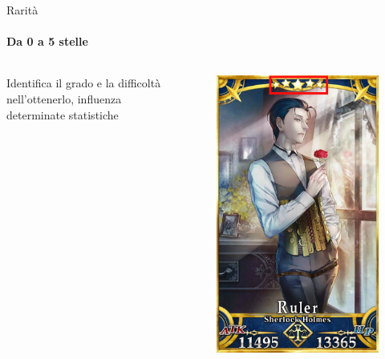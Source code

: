 \documentclass{beamer}
\begin{document}
\begin{darkframes}
  \begin{frame}{Rarità}
    \framesubtitle{Da 0 a 5 stelle}
    \begin{columns}
      \begin{column}{0.5\textwidth}
        Identifica il grado e la difficoltà nell'ottenerlo, influenza determinate statistiche
      \end{column}
      \begin{column}{0.5\textwidth}
        \begin{figure}
          \centering
          \includegraphics[height=0.65\textheight]{./images/servant_rarita.png}
        \end{figure}
      \end{column}
    \end{columns}
  \end{frame}


\end{darkframes}
\end{document}
